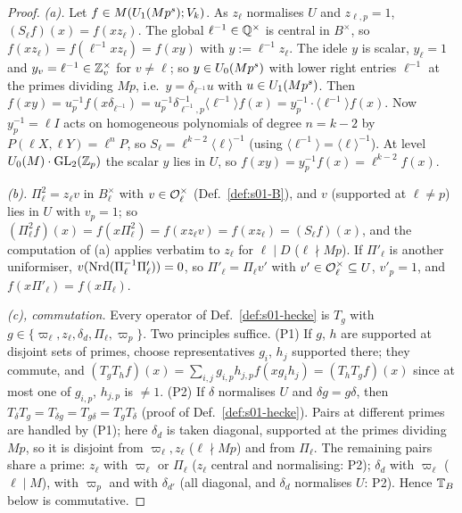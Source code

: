 \begin{proof}
\emph{(a).} Let $f\in M(U_1(Mp^s);V_k)$. As $z_\ell$ normalises $U$ and $z_{\ell,p}=1$, $(S_\ell f)(x)=f(xz_\ell)$. The global
$\ell^{-1}\in\mathbb{Q}^\times$ is central in $B^\times$, so $f(xz_\ell)=f(\ell^{-1}xz_\ell)=f(xy)$ with $y:=\ell^{-1}z_\ell$. The idele $y$ is
scalar, $y_\ell=1$ and $y_v=\ell^{-1}\in\mathbb{Z}_v^\times$ for $v\ne\ell$; so $y\in U_0(Mp^s)$ with lower right entries $\ell^{-1}$ at the primes
dividing $Mp$, i.e.\ $y=\delta_{\ell^{-1}}u$ with $u\in U_1(Mp^s)$. Then
$f(xy)=u_p^{-1}f(x\delta_{\ell^{-1}})=u_p^{-1}\delta_{\ell^{-1},p}^{-1}\langle\ell^{-1}\rangle f(x)=y_p^{-1}\cdot\langle\ell^{-1}\rangle f(x)$. Now
$y_p^{-1}=\ell I$ acts on homogeneous polynomials of degree $n=k-2$ by $P(\ell X,\ell Y)=\ell^nP$, so $S_\ell=\ell^{k-2}\langle\ell\rangle^{-1}$
(using $\langle\ell^{-1}\rangle=\langle\ell\rangle^{-1}$). At level $U_0(M)\cdot\mathrm{GL}_2(\mathbb{Z}_p)$ the scalar $y$ lies in $U$, so $f(xy)=y_p^{-1}f(x)=\ell^{k-2}f(x)$.

\emph{(b).} $\Pi_\ell^2=z_\ell v$ in $B_\ell^\times$ with $v\in\mathcal{O}_\ell^\times$ (Def.~\ref{def:s01-B}), and $v$ (supported at $\ell\ne p$) lies in $U$
with $v_p=1$; so $(\Pi_\ell^2f)(x)=f(x\Pi_\ell^2)=f(xz_\ell v)=f(xz_\ell)=(S_\ell f)(x)$, and the computation of (a) applies verbatim to
$z_\ell$ for $\ell\mid D$ ($\ell\nmid Mp$). If $\Pi'_\ell$ is another uniformiser, $v(\mathrm{Nrd}(\Pi_\ell^{-1}\Pi'_\ell))=0$, so
$\Pi'_\ell=\Pi_\ell v'$ with $v'\in\mathcal{O}_\ell^\times\subseteq U$, $v'_p=1$, and $f(x\Pi'_\ell)=f(x\Pi_\ell)$.

\emph{(c), commutation.} Every operator of Def.~\ref{def:s01-hecke} is $T_g$ with $g\in\{\varpi_\ell,z_\ell,\delta_d,\Pi_\ell,\varpi_p\}$. Two
principles suffice. (P1) If $g$, $h$ are supported at disjoint sets of primes, choose representatives $g_i$, $h_j$ supported there; they
commute, and $(T_gT_hf)(x)=\sum_{i,j}g_{i,p}h_{j,p}f(xg_ih_j)=(T_hT_gf)(x)$ since at most one of $g_{i,p}$, $h_{j,p}$ is $\ne1$. (P2) If $\delta$
normalises $U$ and $\delta g=g\delta$, then $T_\delta T_g=T_{\delta g}=T_{g\delta}=T_gT_\delta$ (proof of Def.~\ref{def:s01-hecke}). Pairs at different
primes are handled by (P1); here $\delta_d$ is taken diagonal, supported at the primes dividing $Mp$, so it is disjoint from
$\varpi_\ell,z_\ell$ ($\ell\nmid Mp$) and from $\Pi_\ell$. The remaining pairs share a prime: $z_\ell$ with $\varpi_\ell$ or $\Pi_\ell$ ($z_\ell$
central and normalising: P2); $\delta_d$ with $\varpi_\ell$ ($\ell\mid M$), with $\varpi_p$ and with $\delta_{d'}$ (all diagonal, and $\delta_d$
normalises $U$: P2). Hence $\mathbb{T}_B$ below is commutative.


\end{proof}
